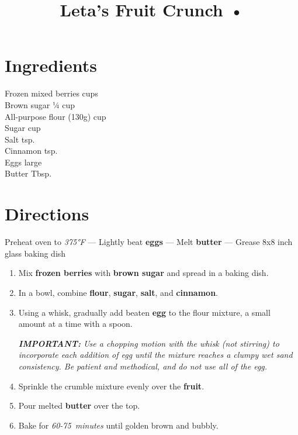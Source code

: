 \documentclass[11pt,letterpaper]{article}
\title{Leta's Fruit Crunch •}
\author{}
\date{}
\begin{document}
\maketitle
\thispagestyle{empty}

\section*{Ingredients}
\setlength{\columnsep}{20pt}
\begin{multicols}{2}
\noindent
    Frozen mixed berries  cups \\
    Brown sugar \dotfill ¼ cup \\
    All-purpose flour (130g) cup \\
    Sugar  cup \\
    Salt  tsp. \\
    Cinnamon  tsp. \\
    Eggs  large \\
    Butter  Tbsp.
\end{multicols}

\section*{Directions}

\noindent
Preheat oven to \textit{375°F} ---
Lightly beat \textbf{eggs} ---
Melt \textbf{butter} ---
Grease 8x8 inch glass baking dish

\begin{enumerate}
    \item Mix \textbf{frozen berries} with \textbf{brown sugar} and spread in a baking dish.
    
    \item In a bowl, combine \textbf{flour}, \textbf{sugar}, \textbf{salt}, and \textbf{cinnamon}.
    
    \item Using a whisk, gradually add beaten \textbf{egg} to the flour mixture, a small amount at a time with a spoon.
    
    \textit{\textbf{IMPORTANT:} Use a chopping motion with the whisk (not stirring) to incorporate each addition of egg until the mixture reaches a clumpy wet sand consistency. Be patient and methodical, and do not use all of the egg.}
    
    \item Sprinkle the crumble mixture evenly over the \textbf{fruit}.
    
    \item Pour melted \textbf{butter} over the top.
    
    \item Bake for \textit{60-75~minutes} until golden brown and bubbly.
\end{enumerate}
\end{document}
